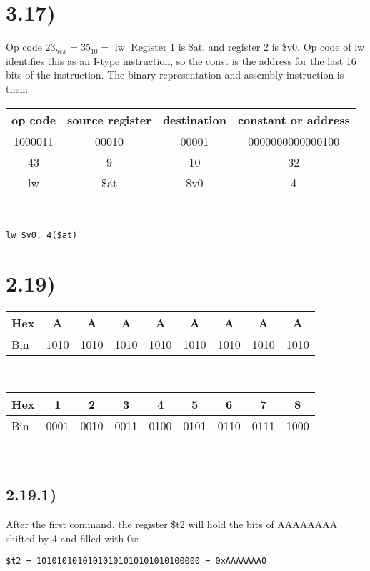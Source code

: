 \documentclass[a4paper,11pt]{article}
\begin{document}

\section*{3.17)} 
 Op code $23_{hex} = 35_{10} =$ lw.  Register 1 is \$at, and register 2 is \$v0.  Op code of lw identifies this as an I-type instruction, so the const is the address for the last 16 bits of the instruction.  The binary representation and assembly instruction is then: \\
 
 \noindent
 \begin{tabular}{| c | c | c | c |}
  \hline	
  op code & source register & destination & constant or address\\  \hline  		
  1000011 & 00010 & 00001 & 0000000000000100 \\ \hline
  43 & 9 & 10 & 32  \\ \hline
  lw & \$at & \$v0 & 4 \\ \hline
\end{tabular} \\

 
\begin{verbatim}
lw $v0, 4($at)
\end{verbatim}


\section*{2.19)} 
\noindent 
\begin{tabular}{| l | c | c | c | c | c | c | c | c |}
  \hline	
  Hex & A & A & A & A & A & A & A & A \\  \hline  		
  Bin & 1010 &1010 & 1010& 1010 & 1010 & 1010 & 1010 & 1010 \\ \hline
\end{tabular} \\

\noindent
\begin{tabular}{| l | c | c | c | c | c | c | c | c |}
  \hline	
  Hex & 1 & 2 & 3 & 4 & 5 & 6 & 7 & 8 \\  \hline  		
  Bin & 0001 & 0010 & 0011 & 0100 & 0101 & 0110 & 0111 & 1000\\ \hline
\end{tabular} \\

\subsection*{2.19.1)}
After the first command, the register \$t2 will hold the bits of AAAAAAAA shifted by 4 and filled with 0s: 
\begin{verbatim}
$t2 = 10101010101010101010101010100000 = 0xAAAAAAA0
\end{verbatim}
\end{document}
